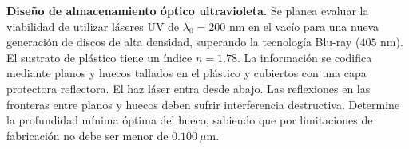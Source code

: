 \item \textbf{Diseño de almacenamiento óptico ultravioleta.}
Se planea evaluar la viabilidad de utilizar láseres UV de $\lambda_0 = 200\text{ nm}$ en el vacío para una nueva generación de discos de alta densidad, superando la tecnología Blu-ray ($405\text{ nm}$). El sustrato de plástico tiene un índice $n = 1.78$. La información se codifica mediante planos y huecos tallados en el plástico y cubiertos con una capa protectora reflectora. El haz láser entra desde abajo. Las reflexiones en las fronteras entre planos y huecos deben sufrir interferencia destructiva. Determine la profundidad mínima óptima del hueco, sabiendo que por limitaciones de fabricación no debe ser menor de $0.100\ \mu\text{m}$.